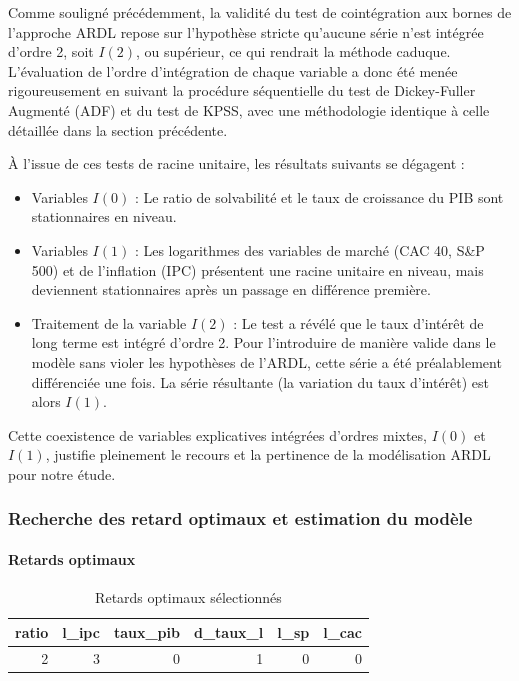 \documentclass[
]{article}
\providecommand{\tightlist}{%
  \setlength{\itemsep}{0pt}\setlength{\parskip}{0pt}}
\begin{document}
Comme souligné précédemment, la validité du test de cointégration aux
bornes de l'approche ARDL repose sur l'hypothèse stricte qu'aucune série
n'est intégrée d'ordre 2, soit \(I(2)\), ou supérieur, ce qui rendrait
la méthode caduque. L'évaluation de l'ordre d'intégration de chaque
variable a donc été menée rigoureusement en suivant la procédure
séquentielle du test de Dickey-Fuller Augmenté (ADF) et du test de KPSS,
avec une méthodologie identique à celle détaillée dans la section
précédente.

À l'issue de ces tests de racine unitaire, les résultats suivants se
dégagent :

\begin{itemize}
\tightlist
\item
  Variables \(I(0)\) : Le ratio de solvabilité et le taux de croissance
  du PIB sont stationnaires en niveau.
\item
  Variables \(I(1)\) : Les logarithmes des variables de marché (CAC 40,
  S\&P 500) et de l'inflation (IPC) présentent une racine unitaire en
  niveau, mais deviennent stationnaires après un passage en différence
  première.
\item
  Traitement de la variable \(I(2)\) : Le test a révélé que le taux
  d'intérêt de long terme est intégré d'ordre 2. Pour l'introduire de
  manière valide dans le modèle sans violer les hypothèses de l'ARDL,
  cette série a été préalablement différenciée une fois. La série
  résultante (la variation du taux d'intérêt) est alors \(I(1)\).
\end{itemize}

Cette coexistence de variables explicatives intégrées d'ordres mixtes,
\(I(0)\) et \(I(1)\), justifie pleinement le recours et la pertinence de
la modélisation ARDL pour notre étude.

\subsubsection{Recherche des retard optimaux et estimation du
modèle}\label{recherche-des-retard-optimaux-et-estimation-du-moduxe8le}

\paragraph{Retards optimaux}\label{retards-optimaux}

\begin{longtable}[t]{rrrrrr}
\caption{\label{tab:estimation_modele}Retards optimaux sélectionnés}\\
\toprule
ratio & l\_ipc & taux\_pib & d\_taux\_l & l\_sp & l\_cac\\
\midrule
2 & 3 & 0 & 1 & 0 & 0\\
\bottomrule
\end{longtable}
\end{document}
